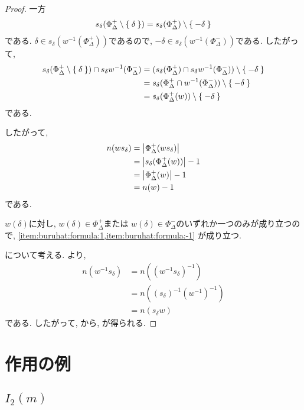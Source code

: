 \begin{proof}
  一方
  \begin{align*}
    s_\delta(\Phi_\Delta^+\setminus \Set{\delta})=s_\delta(\Phi_\Delta^+)\setminus\Set{-\delta}
  \end{align*}
  である.
  $\delta\in s_\delta(w^{-1}(\Phi_\Delta^+))$であるので,
  $-\delta\in s_\delta(w^{-1}(\Phi_\Delta^-))$である.
  したがって,
  \begin{align*}
    s_\delta(\Phi_\Delta^+\setminus \Set{\delta}) \cap s_\delta w^{-1}(\Phi_\Delta^-)
    &=
    (s_\delta(\Phi_\Delta^+) \cap s_\delta w^{-1}(\Phi_\Delta^-))\setminus\Set{-\delta}\\
    &=s_\delta(\Phi_\Delta^+ \cap w^{-1}(\Phi_\Delta^-))\setminus\Set{-\delta}\\
    &=s_\delta(\Phi_\Delta^+(w))\setminus\Set{-\delta}
  \end{align*}
  である. 

  したがって,
  \begin{align*}
    n(ws_\delta)
    &=\left|\Phi_\Delta^+(ws_\delta)\right|\\
    &=\left|s_\delta(\Phi_\Delta^+(w))\right|-1\\
    &=\left|\Phi_\Delta^+(w)\right|-1\\
    &=n(w)-1
  \end{align*}
  である.

  $w(\delta)$に対し,
  $w(\delta)\in\Phi_\Delta^+$または
  $w(\delta)\in\Phi_\Delta^-$のいずれか一つのみが成り立つので,  
  \cref{item:buruhat:formula:1,item:buruhat:formula:-1}
  が成り立つ.
  
  について考える.
  より,
  \begin{align*}
    n(w^{-1}s_\delta)&=n((w^{-1}s_\delta)^{-1})\\
    &=n((s_\delta)^{-1}(w^{-1})^{-1})\\
    &=n(s_\delta w)
  \end{align*}
  である.
  したがって,
  から,
  が得られる.
\end{proof}

\section{作用の例}

\subsection{$I_2(m)$}

